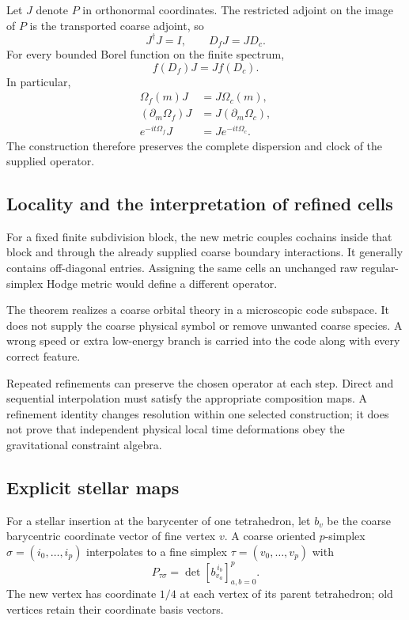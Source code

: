 Let $J$ denote $P$ in orthonormal coordinates. The restricted adjoint on the image of $P$ is the transported coarse adjoint, so
\begin{equation}
J^\dagger J=I,\qquad D_fJ=JD_c.
\end{equation}
For every bounded Borel function on the finite spectrum,
\begin{equation}
f(D_f)J=Jf(D_c).
\end{equation}
In particular,
\begin{align}
\Omega_f(m)J&=J\Omega_c(m),\\
(\partial_m\Omega_f)J&=J(\partial_m\Omega_c),\\
e^{-it\Omega_f}J&=Je^{-it\Omega_c}.
\label{eq:functional}
\end{align}
The construction therefore preserves the complete dispersion and clock of the supplied operator.

\subsection{Locality and the interpretation of refined cells}

For a fixed finite subdivision block, the new metric couples cochains inside that block and through the already supplied coarse boundary interactions. It generally contains off-diagonal entries. Assigning the same cells an unchanged raw regular-simplex Hodge metric would define a different operator.

The theorem realizes a coarse orbital theory in a microscopic code subspace. It does not supply the coarse physical symbol or remove unwanted coarse species. A wrong speed or extra low-energy branch is carried into the code along with every correct feature.

Repeated refinements can preserve the chosen operator at each step. Direct and sequential interpolation must satisfy the appropriate composition maps. A refinement identity changes resolution within one selected construction; it does not prove that independent physical local time deformations obey the gravitational constraint algebra.

\subsection{Explicit stellar maps}

For a stellar insertion at the barycenter of one tetrahedron, let $b_v$ be the coarse barycentric coordinate vector of fine vertex $v$. A coarse oriented $p$-simplex $\sigma=(i_0,\ldots,i_p)$ interpolates to a fine simplex $\tau=(v_0,\ldots,v_p)$ with
\begin{equation}
P_{\tau\sigma}=\det[b_{v_a}^{\,i_b}]_{a,b=0}^p.
\end{equation}
The new vertex has coordinate $1/4$ at each vertex of its parent tetrahedron; old vertices retain their coordinate basis vectors.

